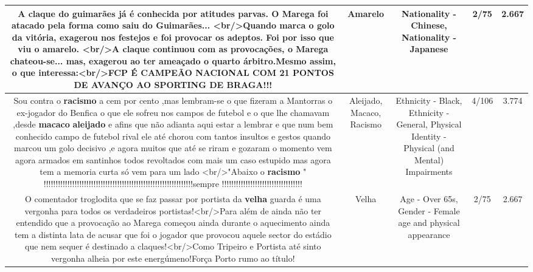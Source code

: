 \documentclass[11pt]{article}
\newlength\mylength
\begin{document}
\begin{center}
\begin{longtable}{|C{.65\mylength}|C{.30\mylength}|C{.12\mylength}|C{.12\mylength}|C{.12\mylength}|}
  \small A claque do guimarães já é conhecida por atitudes parvas. O Marega foi atacado pela forma como saiu do Guimarães... <br/>Quando marca o golo da vitória, exagerou nos festejos e foi provocar os adeptos. Foi por isso que viu o \textbf{a\textbf{marelo}}. <br/>A claque continuou com as provocações, o Marega chateou-se... mas, exagerou ao ter ameaçado o quarto árbitro.Mesmo assim, o que interessa:<br/>FCP É CAMPEÃO NACIONAL COM 21 PONTOS DE AVANÇO AO SPORTING DE BRAGA!!!\normalsize   & Amarelo & Nationality - Chinese, Nationality - Japanese & 2/75 & 2.667 \\  \hline
  \small Sou contra o \textbf{racismo} a cem por cento ,mas lembram-se o que fizeram a Mantorras o ex-jogador do Benfica o que ele sofreu nos campos de futebol e o que lhe chamavam ,desde \textbf{macaco} \textbf{aleijado} e afins que não adianta aqui estar a lembrar e que num bem conhecido campo de futebol  rival ele até chorou com tantos insultos e gestos quando marcou um golo decisivo ,e agora muitos que até se riram e gozaram o momento vem agora  armados em santinhos  todos revoltados com mais um caso estupido mas agora tem a memoria curta só vem para um lado <br/>"Abaixo o \textbf{racismo} " !!!!!!!!!!!!!!!!!!!!!!!!!!!!!!!!!!!!!!!!!!!!!!!!!!!!!!!!!!!!!!!sempre !!!!!!!!!!!!!!!!!!!!!!!!!!!!!!!!!!\normalsize   & Aleijado, Macaco, Racismo & Ethnicity - Black, Ethnicity - General, Physical Identity - Physical (and Mental) Impairments & 4/106 & 3.774 \\  \hline
  \small O comentador troglodita que se faz passar por portista da \textbf{v\textbf{elha}} guarda é uma  vergonha para todos os verdadeiros portistas!<br/>Para além de ainda não ter entendido que a provocação ao Marega começou ainda durante o aquecimento ainda tem a distinta lata de acusar que foi o jogador que provocou aquele sector do estádio que nem sequer é destinado a claques!<br/>Como Tripeiro e Portista até sinto vergonha  alheia por este energúmeno!Força Porto rumo ao título!\normalsize   & Velha & Age - Over 65s, Gender - Female age and physical appearance & 2/75 & 2.667 \\  \hline

\end{longtable}
\end{center}
\end{document}
